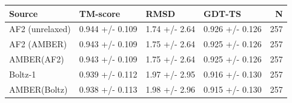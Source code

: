 \begin{tabular}{llllr}
\toprule
Source & TM-score & RMSD & GDT-TS & N \\
\midrule
AF2 (unrelaxed) & 0.944 +/- 0.109 & 1.74 +/- 2.64 & 0.926 +/- 0.126 & 257 \\
AF2 (AMBER) & 0.943 +/- 0.109 & 1.75 +/- 2.64 & 0.925 +/- 0.126 & 257 \\
AMBER(AF2) & 0.943 +/- 0.109 & 1.75 +/- 2.64 & 0.925 +/- 0.126 & 257 \\
Boltz-1 & 0.939 +/- 0.112 & 1.97 +/- 2.95 & 0.916 +/- 0.130 & 257 \\
AMBER(Boltz) & 0.938 +/- 0.113 & 1.98 +/- 2.96 & 0.915 +/- 0.130 & 257 \\
\bottomrule
\end{tabular}
